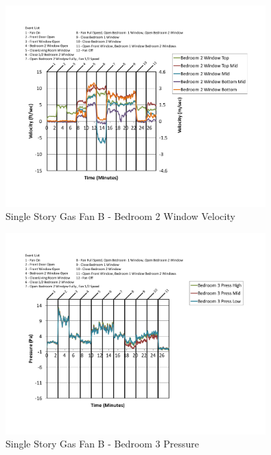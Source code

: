 \documentclass{article}
\begin{document}
\begin{appendices}
	\begin{figure}[H]
		\centering
		\includegraphics[height=3.05in,trim=0.67in 1.1in 0.67in 0.8in,clip=true]{0_Images/Results_Charts/ColdFlow/Single_Story/Gas/B/Bedroom_2_Window_Velocity.pdf}
		\caption{Single Story Gas Fan B - Bedroom 2 Window Velocity}
	\end{figure}
 

	\begin{figure}[H]
		\centering
		\includegraphics[height=3.05in,trim=0.67in 1.1in 0.67in 0.8in,clip=true]{0_Images/Results_Charts/ColdFlow/Single_Story/Gas/B/Bedroom_3_Pressure.pdf}
		\caption{Single Story Gas Fan B - Bedroom 3 Pressure}
	\end{figure}
 
	\clearpage


\end{appendices}
\end{document}
